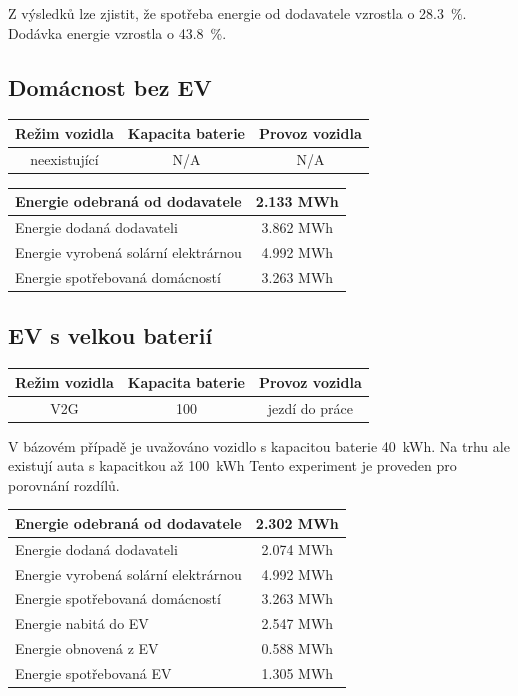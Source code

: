 \documentclass[12pt,a4paper]{article}
\begin{document}
Z výsledků lze zjistit, že spotřeba energie od dodavatele vzrostla o 28.3~\%. Dodávka energie vzrostla o 43.8~\%.

\subsection{Domácnost bez EV}

\bigskip
\begin{tabular}{ | c | c | c | }
\hline
Režim vozidla & Kapacita baterie & Provoz vozidla \\
\hline
neexistující & N/A & N/A \\
\hline
\end{tabular}
\bigskip

\bigskip
\begin{tabular}{ | l | c | }
\hline
Energie odebraná od dodavatele & 2.133 MWh \\
\hline
Energie dodaná dodavateli &  3.862 MWh \\
\hline
Energie vyrobená solární elektrárnou & 4.992 MWh \\
\hline
Energie spotřebovaná domácností & 3.263 MWh \\
\hline
\end{tabular}
\bigskip


\subsection{EV s velkou baterií}

\bigskip
\begin{tabular}{ | c | c | c | }
\hline
Režim vozidla & Kapacita baterie & Provoz vozidla \\
\hline
V2G & 100 & jezdí do práce \\
\hline
\end{tabular}
\bigskip

V bázovém případě je uvažováno vozidlo s kapacitou baterie 40~kWh.
Na trhu ale existují auta s kapacitkou až 100~kWh
Tento experiment je proveden pro porovnání rozdílů.

\bigskip
\begin{tabular}{ | l | c | }
\hline
Energie odebraná od dodavatele & 2.302 MWh \\
\hline
Energie dodaná dodavateli & 2.074 MWh \\
\hline
Energie vyrobená solární elektrárnou & 4.992 MWh \\
\hline
Energie spotřebovaná domácností & 3.263 MWh \\
\hline
Energie nabitá do EV & 2.547 MWh \\
\hline
Energie obnovená z EV & 0.588 MWh \\
\hline
Energie spotřebovaná EV & 1.305 MWh \\
\hline
\end{tabular}
\bigskip
\end{document}
